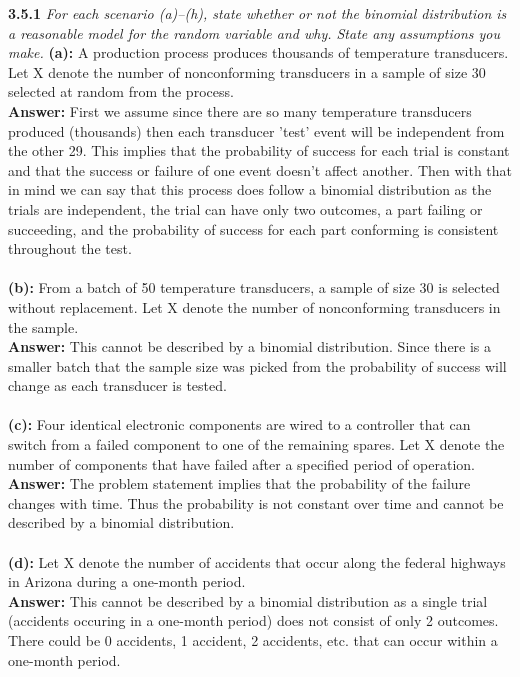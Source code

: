 \documentclass[11pt]{article}
\begin{document}
\noindent \textbf{3.5.1} \emph{For each scenario (a)–(h), state whether or not the binomial distribution is a reasonable model for the random variable and why. State any assumptions you make.}
\textbf{(a):} A production process produces thousands of temperature transducers. Let X denote the number of nonconforming transducers in a sample of size 30 selected at random from the process.
\\\textbf{Answer: } First we assume since there are so many temperature transducers produced (thousands) then each transducer 'test' event will be independent from the other 29. This implies that the probability of success for each trial is constant and that the success or failure of one event doesn't affect another. Then with that in mind we can say that this process does follow a binomial distribution as the trials are independent, the trial can have only two outcomes, a part failing or succeeding, and the probability of success for each part conforming is consistent throughout the test. \\\\
\textbf{(b):} From a batch of 50 temperature transducers, a sample of size 30 is selected without replacement. Let X denote the number of nonconforming transducers in the sample.
\\\textbf{Answer: } This cannot be described by a binomial distribution. Since there is a smaller batch that the sample size was picked from the probability of success will change as each transducer is tested. \\\\
\textbf{(c):} Four identical electronic components are wired to a controller that can switch from a failed component to one of the remaining spares. Let X denote the number of components that have failed after a specified period of operation.
\\\textbf{Answer: } The problem statement implies that the probability of the failure changes with time. Thus the probability is not constant over time and cannot be described by a binomial distribution. \\\\
\textbf{(d):} Let X denote the number of accidents that occur along the federal highways in Arizona during a one-month period.
\\\textbf{Answer: } This cannot be described by a binomial distribution as a single trial (accidents occuring in a one-month period) does not consist of only 2 outcomes. There could be 0 accidents, 1 accident, 2 accidents, etc. that can occur within a one-month period. \\\\
\end{document}
